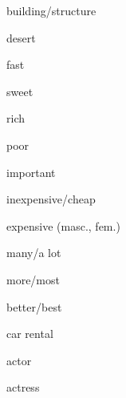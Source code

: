\begin{flashcard}{\LARGE building/structure}
\LARGE {}
\end{flashcard}
\begin{flashcard}{\LARGE desert}
\LARGE {}
\end{flashcard}
\begin{flashcard}{\LARGE fast}
\LARGE {}
\end{flashcard}
\begin{flashcard}{\LARGE sweet}
\LARGE {}
\end{flashcard}
\begin{flashcard}{\LARGE rich}
\LARGE {}
\end{flashcard}
\begin{flashcard}{\LARGE poor}
\LARGE {}
\end{flashcard}
\begin{flashcard}{\LARGE important}
\LARGE {}
\end{flashcard}
\begin{flashcard}{\LARGE inexpensive/cheap}
\LARGE {}
\end{flashcard}
\begin{flashcard}{\LARGE expensive (masc., fem.)}
\LARGE {}
\end{flashcard}
\begin{flashcard}{\LARGE many/a lot}
\LARGE {}
\end{flashcard}
\begin{flashcard}{\LARGE more/most}
\LARGE {}
\end{flashcard}
\begin{flashcard}{\LARGE better/best}
\LARGE {}
\end{flashcard}
\begin{flashcard}{\LARGE car rental}
\LARGE {}
\end{flashcard}
\begin{flashcard}{\LARGE actor}
\LARGE {}
\end{flashcard}
\begin{flashcard}{\LARGE actress}
\LARGE {}
\end{flashcard}
